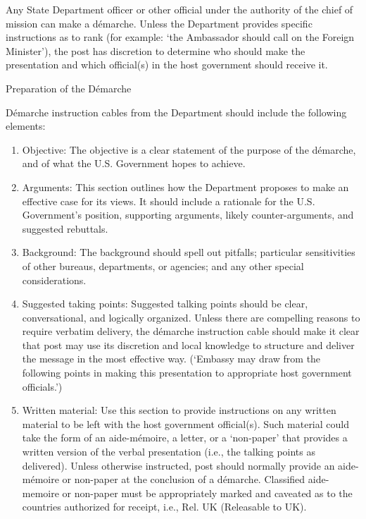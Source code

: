 \documentclass[
  openany]{book}
\begin{document}
Any State Department officer or other official under the authority of the chief of mission can make a démarche. Unless the Department provides specific instructions as to rank (for example: `the Ambassador should call on the Foreign Minister'), the post has discretion to determine who should make the presentation and which official(s) in the host government should receive it.

Preparation of the Démarche

Démarche instruction cables from the Department should include the following elements:

\begin{enumerate}
\def\labelenumi{\arabic{enumi}.}
\item
  Objective: The objective is a clear statement of the purpose of the démarche, and of what the U.S. Government hopes to achieve.
\item
  Arguments: This section outlines how the Department proposes to make an effective case for its views. It should include a rationale for the U.S. Government's position, supporting arguments, likely counter-arguments, and suggested rebuttals.
\item
  Background: The background should spell out pitfalls; particular sensitivities of other bureaus, departments, or agencies; and any other special considerations.
\item
  Suggested taking points: Suggested talking points should be clear, conversational, and logically organized. Unless there are compelling reasons to require verbatim delivery, the démarche instruction cable should make it clear that post may use its discretion and local knowledge to structure and deliver the message in the most effective way. (`Embassy may draw from the following points in making this presentation to appropriate host government officials.')
\item
  Written material: Use this section to provide instructions on any written material to be left with the host government official(s). Such material could take the form of an aide-mémoire, a letter, or a `non-paper' that provides a written version of the verbal presentation (i.e., the talking points as delivered). Unless otherwise instructed, post should normally provide an aide-mémoire or non-paper at the conclusion of a démarche. Classified aide-memoire or non-paper must be appropriately marked and caveated as to the countries authorized for receipt, i.e., Rel. UK (Releasable to UK).
\end{enumerate}
\end{document}
